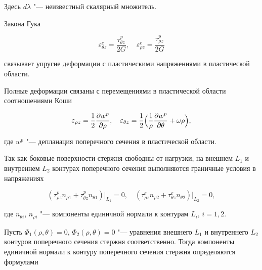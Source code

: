 Здесь $d\lambda$ "--- неизвестный скалярный множитель.



Закона Гука 

 \begin{equation}

\label{kovalev:eq_13}

  \varepsilon_{\theta z}^e=\dfrac{\tau_{\theta z}^p}{2G}, \quad

  \varepsilon_{\rho z}^e=\dfrac{\tau_{\rho z}^p}{2G}

 \end{equation}

связывает упругие деформации с пластическими напряжениями в пластической области. 

Полные деформации связаны с перемещениями в пластической области соотношениями Коши

 \begin{equation}\label{kovalev:eq_14}

   \varepsilon_{\rho z}=\dfrac12\dfrac{\partial w^p}{\partial \rho}, \quad

   \varepsilon_{\theta z}=\dfrac12\Bigl(\dfrac1{\rho}\dfrac{\partial w^p}{\partial\theta}+\omega \rho\Bigr),

 \end{equation}

где $w^p$ "--- депланация поперечного сечения в пластической области.



Так как боковые поверхности стержня свободны от нагрузки, на внешнем $L_1$ и внутреннем $L_2$  контурах поперечного сечения выполняются граничные условия в напряжениях

\begin{equation}

\label{kovalev:eq_15}

     (\tau_{\rho z}^p n_{\rho 1}+\tau_{\theta z}^p n_{\theta1} )\bigl|_{L_1}=0, \quad 

     (\tau_{\rho z}^e n_{\rho 2}+\tau_{\theta z}^e n_{\theta2} )\bigr|_{L_2}=0,

\end{equation}

где $n_{\theta i}$,  $n_{\rho i}$ "--- компоненты единичной нормали к контурам $L_i$,  $i=1, 2$.



Пусть $\Phi_1(\rho,\theta)=0$, $\Phi_2(\rho,\theta)=0$ "--- уравнения внешнего $L_1$  и внутреннего $L_2$  контуров поперечного сечения стержня соответственно. Тогда компоненты единичной нормали к контуру поперечного сечения стержня определяются формулами

